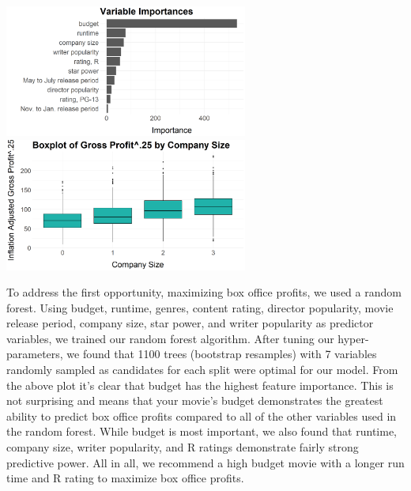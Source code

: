 \documentclass[10pt]{article}
\begin{document}
\begin{center}
\includegraphics[width=8cm]{_assets/predictive_analysis/variable_importance_rf_bop.png}
\hspace{1cm}
\includegraphics[width=8cm]{_assets/_eda/co_size_iagp_bp.png}
\end{center}

\quad To address the first opportunity, maximizing box office profits, we used a random forest. Using budget, runtime, genres, content rating, director popularity, movie release period, company size, star power, and writer popularity as predictor variables, we trained our random forest algorithm. After tuning our hyper-parameters, we found that 1100 trees (bootstrap resamples) with 7 variables randomly sampled as candidates for each split were optimal for our model. From the above plot it's clear that budget has the highest feature importance. This is not surprising and means that your movie’s budget demonstrates the greatest ability to predict box office profits compared to all of the other variables used in the random forest. While budget is most important, we also found that runtime, company size, writer popularity, and R ratings demonstrate fairly strong predictive power. All in all, we recommend a high budget movie with a longer run time and R rating to maximize box office profits. 
\end{document}

